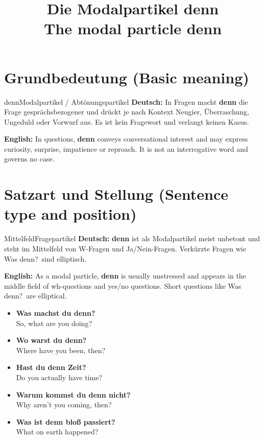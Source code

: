 \documentclass[a4paper,11pt]{article}
\title{Die Modalpartikel \glqq denn\grqq\\{\large\textnormal{The modal particle denn}}}
\date{}
\newcommand{\GermanText}[1]{\textbf{Deutsch: }#1\par}
\newcommand{\EnglishText}[1]{{\small\color{SoftGray}\textbf{English: }#1\par}}
\newcommand{\ExampleItem}[2]{\item \textbf{#1}\\{\small\color{SoftGray}#2}}
\begin{document}
\maketitle
\tableofcontents
\section{Grundbedeutung \textnormal{(Basic meaning)}}
\begin{grammarentry}{denn}{Modalpartikel / Abtönungspartikel}
\GermanText{In Fragen macht \textbf{denn} die Frage gesprächsbezogener und drückt je nach Kontext Neugier, Überraschung, Ungeduld oder Vorwurf aus. Es ist kein Fragewort und verlangt keinen Kasus.}
\EnglishText{In questions, \textbf{denn} conveys conversational interest and may express curiosity, surprise, impatience or reproach. It is not an interrogative word and governs no case.}
\end{grammarentry}
\section{Satzart und Stellung \textnormal{(Sentence type and position)}}
\begin{grammarentry}{Mittelfeld}{Fragepartikel}
\GermanText{\textbf{denn} ist als Modalpartikel meist unbetont und steht im Mittelfeld von W-Fragen und Ja/Nein-Fragen. Verkürzte Fragen wie \glqq Was denn?\grqq\ sind elliptisch.}
\EnglishText{As a modal particle, \textbf{denn} is usually unstressed and appears in the middle field of wh-questions and yes/no questions. Short questions like \glqq Was denn?\grqq\ are elliptical.}
\end{grammarentry}
\begin{exbox}\begin{itemize}
\ExampleItem{Was machst du denn?}{So, what are you doing?}
\ExampleItem{Wo warst du denn?}{Where have you been, then?}
\ExampleItem{Hast du denn Zeit?}{Do you actually have time?}
\ExampleItem{Warum kommst du denn nicht?}{Why aren't you coming, then?}
\ExampleItem{Was ist denn bloß passiert?}{What on earth happened?}
\end{itemize}\end{exbox}
\end{document}
